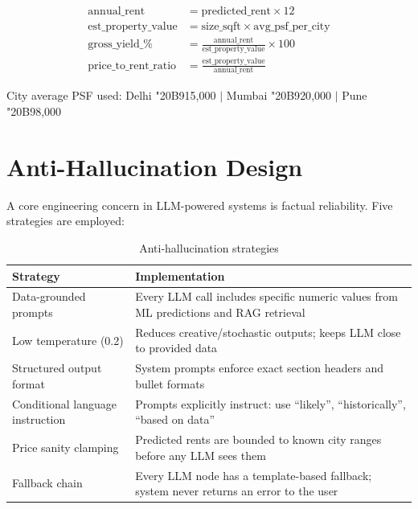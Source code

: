 \documentclass[12pt,a4paper]{article}
\newcommand{\rupee}{{\fontencoding{T1}\selectfont\char"20B9}}
\begin{document}
\begin{align}
\text{annual\_rent}         &= \text{predicted\_rent} \times 12 \\
\text{est\_property\_value} &= \text{size\_sqft} \times \text{avg\_psf\_per\_city} \\
\text{gross\_yield\_\%}     &= \frac{\text{annual\_rent}}{\text{est\_property\_value}} \times 100 \\
\text{price\_to\_rent\_ratio} &= \frac{\text{est\_property\_value}}{\text{annual\_rent}}
\end{align}

City average PSF used: Delhi \rupee 15{,}000 $|$ Mumbai \rupee 20{,}000 $|$ Pune \rupee 8{,}000

\section{Anti-Hallucination Design}

A core engineering concern in LLM-powered systems is factual reliability. Five strategies are employed:

\begin{table}[H]
\centering
\caption{Anti-hallucination strategies}
\begin{tabularx}{\textwidth}{lX}
\toprule
\textbf{Strategy} & \textbf{Implementation} \\
\midrule
Data-grounded prompts       & Every LLM call includes specific numeric values from ML predictions and RAG retrieval \\
Low temperature (0.2)       & Reduces creative/stochastic outputs; keeps LLM close to provided data \\
Structured output format    & System prompts enforce exact section headers and bullet formats \\
Conditional language instruction & Prompts explicitly instruct: use ``likely'', ``historically'', ``based on data'' \\
Price sanity clamping       & Predicted rents are bounded to known city ranges before any LLM sees them \\
Fallback chain              & Every LLM node has a template-based fallback; system never returns an error to the user \\
\bottomrule
\end{tabularx}
\end{table}
\end{document}
